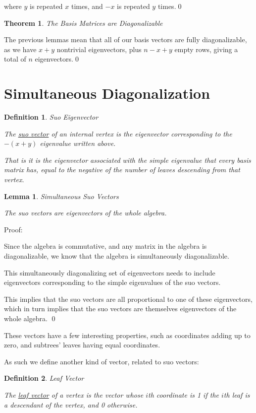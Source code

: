 \documentclass[10pt,a4paper]{report}
\newtheorem{definition}{Definition}
\newtheorem{theorem}{Theorem}
\newtheorem{lemma}{Lemma}
\begin{document}
where $y$ is repeated $x$ times, and $-x$ is repeated $y$ times.\qed

\begin{theorem} The Basis Matrices are Diagonalizable \end{theorem}

The previous lemmas mean that all of our basis vectors are fully
diagonalizable, as we have $x+y$ nontrivial eigenvectors, plus $n-x+y$ empty
rows, giving a total of $n$ eigenvectors.\qed

\section{Simultaneous Diagonalization}

\begin{definition} Suo Eigenvector

	The \underline{suo vector} of an internal vertex is the eigenvector
	corresponding to the $-(x+y)$ eigenvalue written above.

	That is it is the eigenvector associated with the simple eigenvalue that
	every basis matrix has, equal to the negative of the number of leaves
	descending from that vertex.
\end{definition}

\begin{lemma} Simultaneous Suo Vectors

	The suo vectors are eigenvectors of the whole algebra.
\end{lemma}
Proof:

Since the algebra is commutative, and any matrix in the algebra is
diagonalizable, we know that the algebra is simultaneously diagonalizable.

This simultaneously diagonalizing set of eigenvectors needs to include
eigenvectors corresponding to the simple eigenvalues of the suo vectors.

This implies that the suo vectors are all proportional to one of these
eigenvectors, which in turn implies that the suo vectors are themselves
eigenvectors of the whole algebra. \qed

These vectors have a few interesting properties, such as coordinates adding up
to zero, and subtrees' leaves having equal coordinates.

As such we define another kind of vector, related to suo vectors:

\begin{definition} Leaf Vector

	The \underline{leaf vector} of a vertex is the vector whose $i$th
	coordinate is 1 if the $i$th leaf is a descendant of the vertex, and 0
	otherwise.
\end{definition}
\end{document}
